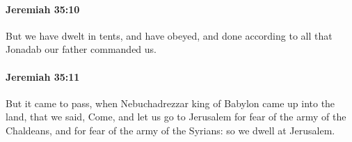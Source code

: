 		\paragraph{Jeremiah 35:10} %
			\label{JEREMIAH-35-10}

			But we have dwelt in tents, and have obeyed, and done according to all that Jonadab our father commanded us.


		\paragraph{Jeremiah 35:11} %
			\label{JEREMIAH-35-11}

			But it came to pass, when Nebuchadrezzar king of Babylon came up into the land, that we said, Come, and let us go to Jerusalem for fear of the army of the Chaldeans, and for fear of the army of the Syrians: so we dwell at Jerusalem.


